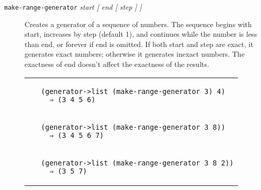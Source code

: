 \begin{description}
\item[\texttt{make-range-generator} \emph{start {[} end {[} step {]}
{]}}]
Creates a generator of a sequence of numbers. The sequence begins with
start, increases by step (default 1), and continues while the number is
less than end, or forever if end is omitted. If both start and step are
exact, it generates exact numbers; otherwise it generates inexact
numbers. The exactness of end doesn't affect the exactness of the
results.

\begin{longtable}[]{@{}ll@{}}
\toprule
\begin{minipage}[t]{0.47\columnwidth}\raggedright\strut
~\strut
\end{minipage} & \begin{minipage}[t]{0.47\columnwidth}\raggedright\strut
\begin{verbatim}
(generator->list (make-range-generator 3) 4)
  ⇒ (3 4 5 6)
\end{verbatim}
\strut
\end{minipage}\tabularnewline
\begin{minipage}[t]{0.47\columnwidth}\raggedright\strut
~\strut
\end{minipage} & \begin{minipage}[t]{0.47\columnwidth}\raggedright\strut
\begin{verbatim}
(generator->list (make-range-generator 3 8))
  ⇒ (3 4 5 6 7)
\end{verbatim}
\strut
\end{minipage}\tabularnewline
\begin{minipage}[t]{0.47\columnwidth}\raggedright\strut
~\strut
\end{minipage} & \begin{minipage}[t]{0.47\columnwidth}\raggedright\strut
\begin{verbatim}
(generator->list (make-range-generator 3 8 2))
  ⇒ (3 5 7)
\end{verbatim}
\strut
\end{minipage}\tabularnewline
\bottomrule
\end{longtable}
\end{description}

